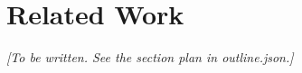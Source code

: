 \section{Related Work}
\label{sec:related_work}
\textit{[To be written. See the section plan in outline.json.]}

